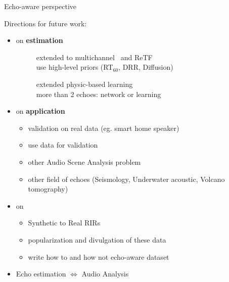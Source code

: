 \begin{frame}{Echo-aware perspective}

    Directions for future work:
    \pause
    \begin{itemize}
        \item[\mytriag] on \textbf{estimation}
        \begin{description}
            \item[\blaster] {\small extended to multichannel~\cite{peic2020sparse} and ReTF~\cite{doclo2002gsvd}
                            \\use high-level priors (RT$_{60}$, DRR, Diffusion)~\cite{badeau2019common}}
            \item[\lantern] {\small extended physic-based learning
                            \\more than 2 echoes: network or learning}
        \end{description}

        \vfill
        \pause
        \item[\mytriag] on \textbf{application}
        \begin{itemize}
            \item validation on real data (eg. smart home speaker)
            \item use \dechorate data for validation
            \item other Audio Scene Analysis problem
            \item other field of echoes (Seismology, Underwater acoustic, Volcano tomography)
        \end{itemize}

        \vfill
        \item[\mytriag] on \dechorate
        \begin{itemize}
            \item Synthetic to Real RIRs
            \item popularization and divulgation of these data
            \item write how to and how not echo-aware dataset
        \end{itemize}

        \vfill
        \pause
        \item[\mytriag] Echo estimation $\Longleftrightarrow$ Audio Analysis
    \end{itemize}

\end{frame}


